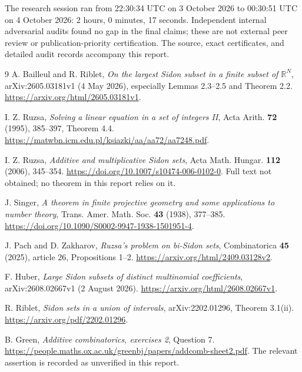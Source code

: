 \documentclass[11pt]{article}
\theoremstyle{definition}
\theoremstyle{remark}
\newcommand{\R}{\mathbb R}
\begin{document}
The research session ran from 22:30:34 UTC on 3 October 2026 to
00:30:51 UTC on 4 October 2026: 2 hours, 0 minutes, 17 seconds.
Independent internal adversarial audits found no gap in the final
claims; these are not external peer review or publication-priority
certification. The source, exact certificates, and detailed audit
records accompany this report.

\clearpage
\begin{thebibliography}{9}
A. Bailleul and R. Riblet,
\emph{On the largest Sidon subset in a finite subset of $\R^N$},
arXiv:2605.03181v1 (4 May 2026), especially Lemmas 2.3--2.5 and
Theorem 2.2. \url{https://arxiv.org/html/2605.03181v1}.

I. Z. Ruzsa, \emph{Solving a linear equation in a set of integers II},
Acta Arith. \textbf{72} (1995), 385--397, Theorem 4.4.
\url{https://matwbn.icm.edu.pl/ksiazki/aa/aa72/aa7248.pdf}.

I. Z. Ruzsa, \emph{Additive and multiplicative Sidon sets},
Acta Math. Hungar. \textbf{112} (2006), 345--354.
\url{https://doi.org/10.1007/s10474-006-0102-0}.
Full text not obtained; no theorem in this report relies on it.

J. Singer, \emph{A theorem in finite projective geometry and some
applications to number theory}, Trans. Amer. Math. Soc.
\textbf{43} (1938), 377--385.
\url{https://doi.org/10.1090/S0002-9947-1938-1501951-4}.

J. Pach and D. Zakharov, \emph{Ruzsa's problem on bi-Sidon sets},
Combinatorica \textbf{45} (2025), article 26, Propositions 1--2.
\url{https://arxiv.org/html/2409.03128v2}.

F. Huber, \emph{Large Sidon subsets of distinct multinomial
coefficients}, arXiv:2608.02667v1 (2 August 2026).
\url{https://arxiv.org/html/2608.02667v1}.

R. Riblet, \emph{Sidon sets in a union of intervals},
arXiv:2202.01296, Theorem 3.1(ii).
\url{https://arxiv.org/pdf/2202.01296}.

B. Green, \emph{Additive combinatorics, exercises 2}, Question 7.
\url{https://people.maths.ox.ac.uk/greenbj/papers/addcomb-sheet2.pdf}.
The relevant assertion is recorded as unverified in this report.
\end{thebibliography}
\end{document}
